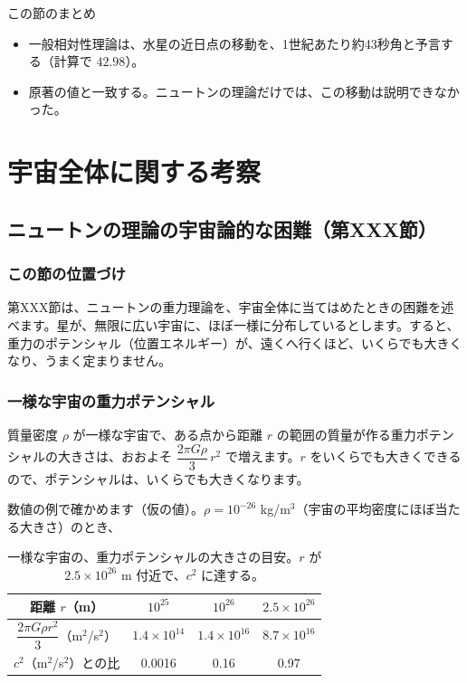 \documentclass[a4paper,11pt,openany]{ltjsbook}
\begin{document}
\begin{pointbox}{この節のまとめ}
\begin{itemize}[leftmargin=*]
\item 一般相対性理論は、水星の近日点の移動を、1世紀あたり約43秒角と予言する（計算で $42.98$）。
\item 原著の値と一致する。ニュートンの理論だけでは、この移動は説明できなかった。
\end{itemize}
\end{pointbox}

\part{宇宙全体に関する考察}

\chapter{ニュートンの理論の宇宙論的な困難（第XXX節）}

\section{この節の位置づけ}

第XXX節は、ニュートンの重力理論を、宇宙全体に当てはめたときの困難を述べます。星が、無限に広い宇宙に、ほぼ一様に分布しているとします。すると、重力のポテンシャル（位置エネルギー）が、遠くへ行くほど、いくらでも大きくなり、うまく定まりません。

\section{一様な宇宙の重力ポテンシャル}

質量密度 $\rho$ が一様な宇宙で、ある点から距離 $r$ の範囲の質量が作る重力ポテンシャルの大きさは、おおよそ $\dfrac{2\pi G\rho}{3}\,r^2$ で増えます。$r$ をいくらでも大きくできるので、ポテンシャルは、いくらでも大きくなります。

数値の例で確かめます（仮の値）。$\rho=10^{-26}$ kg/m$^3$（宇宙の平均密度にほぼ当たる大きさ）のとき、

\begin{table}[htbp]
\centering
\begin{tabular}{c|ccc}
\toprule
距離 $r$（m） & $10^{25}$ & $10^{26}$ & $2.5\times10^{26}$\\
\midrule
$\dfrac{2\pi G\rho r^2}{3}$（m$^2$/s$^2$） & $1.4\times10^{14}$ & $1.4\times10^{16}$ & $8.7\times10^{16}$\\
$c^2$（m$^2$/s$^2$）との比 & 0.0016 & 0.16 & 0.97\\
\bottomrule
\end{tabular}
\caption{一様な宇宙の、重力ポテンシャルの大きさの目安。$r$ が $2.5\times10^{26}$ m 付近で、$c^2$ に達する。}
\end{table}
\end{document}

